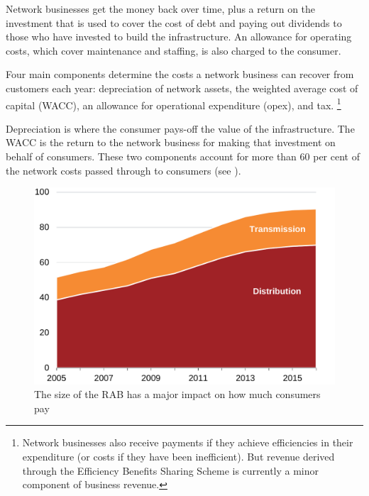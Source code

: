 \documentclass[FrontPage]{grattan}
\begin{document}
Network businesses get the money back over time, plus a return on the investment that is used to cover the cost of debt and paying out dividends to those who have invested to build the infrastructure. An allowance for operating costs, which cover maintenance and staffing, is also charged to the consumer. 

Four main components determine the costs a network business can recover from customers each year: depreciation of network assets, the weighted average cost of capital (WACC), an allowance for operational expenditure (opex), and tax.%
\footnote{Network businesses also receive payments if they achieve efficiencies in their expenditure (or costs if they have been inefficient). But revenue derived through the Efficiency Benefits Sharing Scheme is currently a minor component of business revenue.}

Depreciation is where the consumer pays-off the value of the infrastructure. The WACC is the return to the network business for making that investment on behalf of consumers. These two components account for more than 60 per cent of the network costs passed through to consumers (see ).

\begin{figure}
\caption{The size of the RAB has a major impact on how much consumers pay}\label{fig:size-of-RAB-impacts-how-much-consumers-pay}
\includegraphics[page=5]{atlas/Charts.pdf}
\end{figure}
\end{document}
